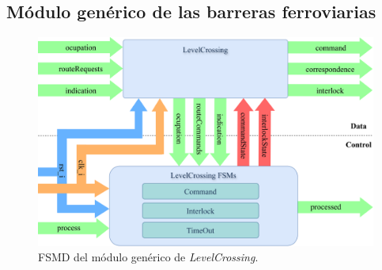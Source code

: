 \subsection{Módulo genérico de las barreras ferroviarias}

\lipsum[1]

\begin{figure}[H]
	\centering
	\includegraphics[width=1\textwidth]{Figuras/LCB_module}
	\centering\caption{FSMD del módulo genérico de \textit{LevelCrossing}.}
	\label{fig:LCB_module}
\end{figure}

\lipsum[1]